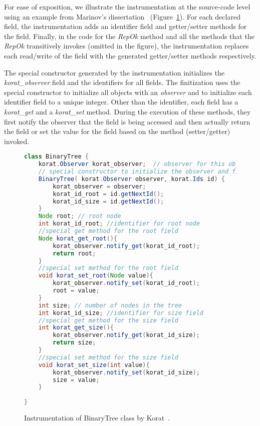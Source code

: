 \para For ease of exposition, we illustrate the instrumentation at the
source-code level using an example from Marinov's
dissertation~\cite{marinov2005automatic} (Figure~\ref{fig:btTreeInstrumentationKorat}).
For each declared field, the instrumentation adds an identifier field
and getter/setter methods for the field. Finally, in the code for the
\emph{RepOk} method and all the methods that the \emph{RepOk}
transitively invokes (omitted in the figure), the instrumentation
replaces each read/write of the field with the generated getter/setter
methods respectively.

\para The special constructor generated by the instrumentation
initializes the \emph{korat\_observer} field and the identifiers for all
fields. The finitization uses the special constructor to initialize
all objects with an \emph{observer} and to initialize each identifier field
to a unique integer. Other than the identifier, each field has a
\emph{korat\_get} and a \emph{korat\_set} method. During the execution of
these methods, they first notify the observer that the field is being
accessed and then actually return the field or set the value for the
field based on the method (setter/getter) invoked.


\begin{figure}
\centering
\begin{lstlisting}[language=Java]
class BinaryTree {
    korat.Observer korat_observer;  // observer for this object
    // special constructor to initialize the observer and field ids
    BinaryTree( korat.Observer observer, korat.Ids id) {
        korat_observer = observer;
        korat_id_root = id.getNextId();
        korat_id_size = id.getNextId();
    }
    Node root; // root node
    int korat_id_root; //identifier for root node
    //special get method for the root field
    Node korat_get_root(){
        korat_observer.notify_get(korat_id_root);
        return root;
    }
    //special set method for the root field
    void korat_set_root(Node value){
        korat_observer.notify_set(korat_id_root);
        root = value;
    }
    int size; // number of nodes in the tree
    int korat_id_size; //identifier for size field
    //special get method for the size field
    int korat_get_size(){ 
        korat_observer.notify_get(korat_id_size);
        return size;
    }
    //special set method for the size field
    void korat_set_size(int value){ 
        korat_observer.notify_set(korat_id_size);
        size = value;
    }
   
}
\end{lstlisting}
\caption{Instrumentation of BinaryTree class by Korat~\cite{marinov2005automatic}.}
\label{fig:btTreeInstrumentationKorat}
\end{figure}


